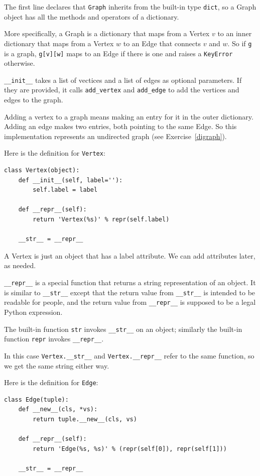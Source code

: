 \documentclass[10pt]{book}
\begin{document}
The first line declares that {\tt Graph} inherits from the built-in
type {\tt dict}, so a Graph object has all the methods and operators
of a dictionary.

More specifically, a Graph is a dictionary that maps from
a Vertex $v$ to an inner dictionary that maps from a Vertex $w$
to an Edge that connects $v$ and $w$.  So if {\tt g} is a graph,
{\tt g[v][w]} maps to an Edge if there is one and raises
a {\tt KeyError} otherwise.

\verb"__init__" takes a list of vectices and a list of
edges as optional parameters.  If they are provided, it calls
\verb"add_vertex" and \verb"add_edge" to add the vertices and edges to
the graph.

Adding a vertex to a graph means making an entry for it in the
outer dictionary.  Adding an edge makes two entries, both pointing
to the same Edge.  So this implementation represents an undirected
graph (see Exercise~\ref{digraph}).

Here is the definition for {\tt Vertex}:

\begin{verbatim}
class Vertex(object):
    def __init__(self, label=''):
        self.label = label

    def __repr__(self):
        return 'Vertex(%s)' % repr(self.label)

    __str__ = __repr__
\end{verbatim}

A Vertex is just an object that has a label attribute.  We can
add attributes later, as needed.

\verb"__repr__" is a special function that returns a string
representation of an object.  It is similar to \verb"__str__" except
that the return value from \verb"__str__" is intended to be readable
for people, and the return value from \verb"__repr__" is supposed to
be a legal Python expression.

The built-in function {\tt str} invokes \verb"__str__" on
an object; similarly the built-in function {\tt repr} invokes
\verb"__repr__".

In this case \verb"Vertex.__str__" and \verb"Vertex.__repr__" refer to
the same function, so we get the same string either way.

Here is the definition for {\tt Edge}:

\begin{verbatim}
class Edge(tuple):
    def __new__(cls, *vs):
        return tuple.__new__(cls, vs)

    def __repr__(self):
        return 'Edge(%s, %s)' % (repr(self[0]), repr(self[1]))

    __str__ = __repr__
\end{verbatim}
\end{document}
